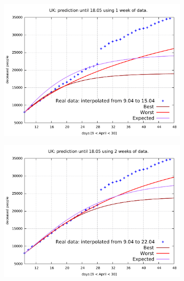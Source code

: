 \documentclass[8pt]{article}
\begin{document}
\begin{figure}[h!]
  \centering
  \begin{subfigure}[b]{0.45\linewidth}
  \includegraphics[width=\linewidth]{../simulations/uk/9-15/9-15.pdf}
  \end{subfigure}
  \begin{subfigure}[b]{0.45\linewidth}
    \includegraphics[width=\linewidth]{../simulations/uk/9-22/9-22.pdf}
  \end{subfigure}
  \begin{subfigure}[b]{0.45\linewidth}

\end{subfigure}
\end{figure}
\end{document}
